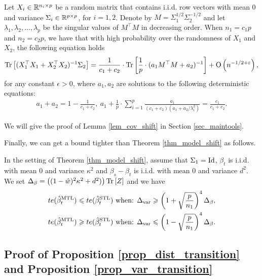 \begin{lemma}\label{lem_cov_shift}
	Let $X_i\in\mathbb{R}^{n_i\times p}$ be a random matrix that contains i.i.d. row vectors with mean $0$ and variance $\Sigma_i\in\mathbb{R}^{p\times p}$, for $i = 1, 2$.
	Denote by $M = \Sigma_1^{1/2}\Sigma_2^{-1/2}$ and let $\lambda_1, \lambda_2, \dots, \lambda_p$ be the singular values of $M^{\top}M$ in decreasing order.
	When $n_1 = c_1 p$ and $n_2 = c_2 p$, we have that with high probability over the randomness of $X_1$ and $X_2$, the following equation holds
	\begin{align}%
		\bigtr{(X_1^{\top}X_1 + X_2^{\top}X_2)^{-1}\Sigma_2} = \frac{1}{c_1+c_2}\cdot \bigtr{ \frac{1}{p}\cdot(a_1 M^\top M + a_2)^{-1}} +\bigo{ n^{-1/2+\epsilon}},
	\end{align}
	for any constant $\epsilon>0$, where $a_1, a_2$ are solutions to the following deterministic equations:
	\begin{align}
		a_1 + a_2 = 1- \frac{1}{c_1 + c_2},~ a_1 + \frac{1}{p}\cdot\sum_{i=1}^p \frac{a_1}{(c_1 + c_2)(a_1 + a_2/ \lambda_i^2)} = \frac{c_1}{c_1 + c_2}. \label{eq_a12}
	\end{align}
\end{lemma}
We will give the proof of Lemma \ref{lem_cov_shift} in Section \ref{sec_maintools}.

Finally, we can get a bound tighter than Theorem \ref{thm_model_shift} as follows.
\begin{lemma}\label{prop_model_shift_tight}
		In the setting of Theorem \ref{thm_model_shift}, assume that $\Sigma_1 =\operatorname{Id}$,
		$\beta_t$ is i.i.d. with mean $0$ and variance $\kappa^2$ and $\beta_s - \beta_t$ is i.i.d. with mean $0$ and variance $d^2$.
		We set $\Delta_{\beta} = \left({(1 - \hat{w})^2 \kappa^2 + d^2)}\right) \operatorname{Tr}\left[Z\right]$
		and we have
		\begin{align*}
			te(\hat{\beta}_t^{\text{MTL}}) \leqslant te(\hat{\beta}_t^{\text{STL}}) \text{ when: } & \Delta_{\text{var}} \geqslant \left({1 + \sqrt{\frac{p}{n_1}}}\right)^4 \Delta_{\beta}, \\
			te(\hat{\beta}_t^{\text{MTL}}) \geqslant te(\hat{\beta}_t^{\text{STL}}) \text{ when: } & \Delta_{\text{var}} \leqslant \left({1 - \sqrt{\frac{p}{n_1}}}\right)^4 \Delta_{\beta}.
		\end{align*}
\end{lemma}

\subsection{Proof of Proposition \ref{prop_dist_transition} and Proposition \ref{prop_var_transition}}\label{app_proof_31}

